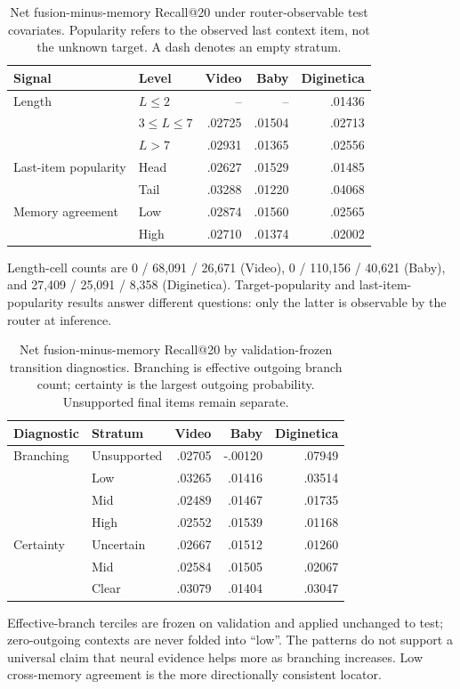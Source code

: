 \documentclass[runningheads]{llncs}
\begin{document}
\begin{table}[H]
\caption{Net fusion-minus-memory Recall@20 under router-observable test
covariates. Popularity refers to the observed last context item, not the
unknown target. A dash denotes an empty stratum.}
\centering\small
\begin{tabular}{llrrr}
\toprule
Signal & Level & Video & Baby & Diginetica\\
\midrule
Length & $L\leq2$ & -- & -- & .01436\\
       & $3\leq L\leq7$ & .02725 & .01504 & .02713\\
       & $L>7$ & .02931 & .01365 & .02556\\
Last-item popularity & Head & .02627 & .01529 & .01485\\
                     & Tail & .03288 & .01220 & .04068\\
Memory agreement & Low & .02874 & .01560 & .02565\\
                 & High & .02710 & .01374 & .02002\\
\bottomrule
\end{tabular}
\end{table}
Length-cell counts are 0 / 68,091 / 26,671 (Video),
0 / 110,156 / 40,621 (Baby), and 27,409 / 25,091 / 8,358 (Diginetica).
Target-popularity and last-item-popularity results answer different questions:
only the latter is observable by the router at inference.

\begin{table}[H]
\caption{Net fusion-minus-memory Recall@20 by validation-frozen transition
diagnostics. Branching is effective outgoing branch count; certainty is the
largest outgoing probability. Unsupported final items remain separate.}
\centering\small
\begin{tabular}{llrrr}
\toprule
Diagnostic & Stratum & Video & Baby & Diginetica\\
\midrule
Branching & Unsupported & .02705 & -.00120 & .07949\\
          & Low & .03265 & .01416 & .03514\\
          & Mid & .02489 & .01467 & .01735\\
          & High & .02552 & .01539 & .01168\\
\midrule
Certainty & Uncertain & .02667 & .01512 & .01260\\
          & Mid & .02584 & .01505 & .02067\\
          & Clear & .03079 & .01404 & .03047\\
\bottomrule
\end{tabular}
\end{table}
Effective-branch terciles are frozen on validation and applied unchanged to
test; zero-outgoing contexts are never folded into ``low''. The patterns do
not support a universal claim that neural evidence helps more as branching
increases. Low cross-memory agreement is the more directionally consistent
locator.
\end{document}
